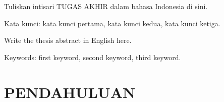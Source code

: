 \documentclass[skripsi]{ugmskripsi}
\begin{document}
\tableofcontents
\listoftables
\listoffigures


\begin{abstractind}

Tuliskan intisari TUGAS AKHIR dalam bahasa Indonesia di sini.

\bigskip
Kata kunci: kata kunci pertama, kata kunci kedua, kata kunci ketiga.
\end{abstractind}

\begin{abstracteng}

Write the thesis abstract in English here.

\bigskip
Keywords: first keyword, second keyword, third keyword.
\end{abstracteng}


\chapter{PENDAHULUAN}
\end{document}
